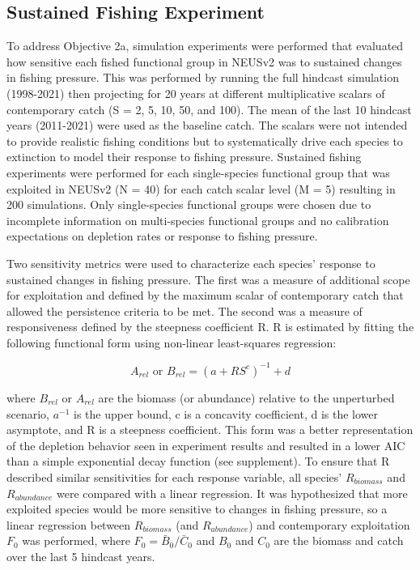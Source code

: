 \documentclass[
]{article}
\begin{document}
\subsection{Sustained Fishing Experiment}\label{sustained-fishing-experiment}

To address Objective 2a, simulation experiments were performed that evaluated how sensitive each fished functional group in NEUSv2 was to sustained changes in fishing pressure. This was performed by running the full hindcast simulation (1998-2021) then projecting for 20 years at different multiplicative scalars of contemporary catch (S = 2, 5, 10, 50, and 100). The mean of the last 10 hindcast years (2011-2021) were used as the baseline catch. The scalars were not intended to provide realistic fishing conditions but to systematically drive each species to extinction to model their response to fishing pressure. Sustained fishing experiments were performed for each single-species functional group that was exploited in NEUSv2 (N = 40) for each catch scalar level (M = 5) resulting in 200 simulations. Only single-species functional groups were chosen due to incomplete information on multi-species functional groups and no calibration expectations on depletion rates or response to fishing pressure.

Two sensitivity metrics were used to characterize each species' response to sustained changes in fishing pressure. The first was a measure of additional scope for exploitation and defined by the maximum scalar of contemporary catch that allowed the persistence criteria to be met. The second was a measure of responsiveness defined by the steepness coefficient R. R is estimated by fitting the following functional form using non-linear least-squares regression:

\begin{equation}
  A_{rel} \text{ or } B_{rel} = (a + RS^{c})^{-1} + d
  \label{eq:responsiveness}
\end{equation}

where \(B_{rel}\) or \(A_{rel}\) are the biomass (or abundance) relative to the unperturbed scenario, \(a^{-1}\) is the upper bound, c is a concavity coefficient, d is the lower asymptote, and R is a steepness coefficient. This form was a better representation of the depletion behavior seen in experiment results and resulted in a lower AIC than a simple exponential decay function (see supplement). To ensure that R described similar sensitivities for each response variable, all species' \(R_{biomass}\) and \(R_{abundance}\) were compared with a linear regression. It was hypothesized that more exploited species would be more sensitive to changes in fishing pressure, so a linear regression between \(R_{biomass}\) (and \(R_{abundance}\)) and contemporary exploitation \(F_0\) was performed, where \(F_{0} = \bar{B}_{0} / \bar{C}_{0}\) and \(B_0\) and \(C_0\) are the biomass and catch over the last 5 hindcast years.
\end{document}
